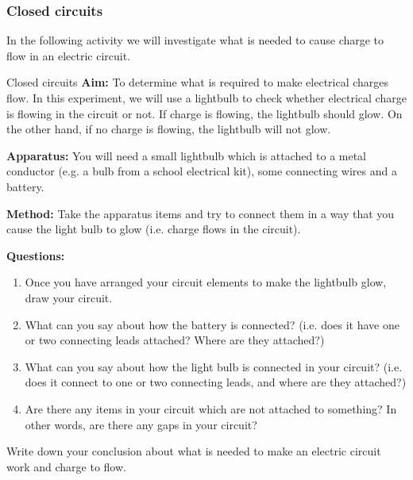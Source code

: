             \subsubsection{ Closed circuits}
            \nopagebreak
        \label{m38771*id62637}In the following activity we will investigate what is needed to cause charge to flow in an electric circuit.\par 
\label{m38771*secfhsst!!!underscore!!!id97}
            \begin{f_experiment}{Closed circuits}
            \nopagebreak
            \label{m38771*id62648}\noindent{}\textbf{Aim:}
To determine what is required to make electrical charges flow.
In this experiment, we will use a lightbulb to check whether electrical charge is flowing in the circuit or not. If charge is flowing, the lightbulb should glow. On the other hand, if no charge is flowing, the lightbulb will not glow.\par 
        \label{m38771*id62665}\noindent{}\textbf{Apparatus:}
        You will need a small lightbulb which is attached to a metal conductor (e.g. a bulb from a school electrical kit), some connecting wires and a battery.\par 
        \label{m38771*id62679}\noindent{}\textbf{Method:}
        Take the apparatus items and try to connect them in a way that you cause the light bulb to glow (i.e. charge flows in the circuit).\par 
        \label{m38771*id62694}\noindent{}\textbf{Questions:}
        \label{m38771*id62702}\begin{enumerate}[noitemsep, label=\textbf{\arabic*}. ] 
            \label{m38771*uid6}\item Once you have arranged your circuit elements to make the lightbulb glow, draw your circuit.
\label{m38771*uid7}\item What can you say about how the battery is connected? (i.e. does it have one or two connecting leads attached? Where are they attached?)
\label{m38771*uid8}\item What can you say about how the light bulb is connected in your circuit? (i.e. does it connect to one or two connecting leads, and where are they attached?)
\label{m38771*uid9}\item Are there any items in your circuit which are not attached to something? In other words, are there any gaps in your circuit?
\end{enumerate}
        \par 
        \label{m38771*id62757}Write down your conclusion about what is needed to make an electric circuit work and charge to flow.
 \par\end{f_experiment}

